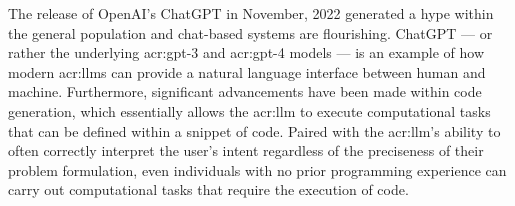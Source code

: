 \begin{comment}
Having a template to work from provides a starting point.
However, for a given project, a slight variation in the template may be required due to the nature of the given project.
Furthermore, the order in which the various chapters and sections will be written will also vary from project to project,
but the writing will seldom start at the abstract and sequentially follow the chapters of the report.
One critical reason for this is that you need to start writing as early as possible and that you will begin to write up where you are currently focusing.
However, do not leave working on the abstract until the very last days. The abstract is the first thing anyone reads of an article or thesis --- after the title;
and thus it is important that it is very well written. Abstracts are hard to write, so create revisions throughout the course of your project.

The background and motivation here should state where your project is situated in the field and what the key driving forces motivating this research are.
However, keep this section brief, as it is still part of the introduction.
The motivation will be further elaborated on in Chapter~\ref{cha:related_work}, presenting your complete state-of-the-art.

Note that this template uses italics to highlight where Latin wording is inserted to represent text and the text of the template
that we wish to draw your attention to. The italics themselves are not an indication that such sections should use italics.

\end{comment}

The release of OpenAI's ChatGPT in November, 2022 \citep{openaiIntroducingChatGPT2022} generated a hype within the general population and chat-based systems are flourishing. ChatGPT --- or rather the underlying \acrshort{acr:gpt}-3 and \acrshort{acr:gpt}-4 models --- is an example of how modern \glspl{acr:llm} can provide a natural language interface between human and machine. Furthermore, significant advancements have been made within code generation, which essentially allows the \gls{acr:llm} to execute computational tasks that can be defined within a snippet of code. Paired with the \gls{acr:llm}'s ability to often correctly interpret the user's intent regardless of the preciseness of their problem formulation, even individuals with no prior programming experience can carry out computational tasks that require the execution of code.


